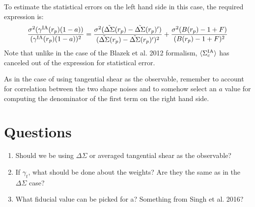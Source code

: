 \documentclass[onecolumn,amsmath,aps,fleqn, superscriptaddress]{revtex4}
\begin{document}
To estimate the statistical errors on the left hand side in this case, the required expression is:
\begin{equation}
\frac{\sigma^2(\gamma^{\rm IA}(r_p)(1-a))}{(\gamma^{\rm IA}(r_p)(1-a))^2} = \frac{\sigma^2(\tilde{\Delta \Sigma}(r_p) - \tilde{\Delta \Sigma}(r_p)^\prime)}{(\tilde{\Delta \Sigma}(r_p) - \tilde{\Delta \Sigma}(r_p)^\prime)^2} + \frac{\sigma^2(B(r_p)-1+F)}{(B(r_p)-1+F)^2}
\label{error_DS}
\end{equation}
Note that unlike in the case of the Blazek et al. 2012 formalism, $\langle \Sigma_c^{\rm IA}\rangle$ has canceled out of the expression for statistical error. 

As in the case of using tangential shear as the observable, remember to account for correlation between the two shape noises and to somehow select an $a$ value for computing the denominator of the first term on the right hand side.

\section*{Questions}
\begin{enumerate}
\item{Should we be using $\Delta \Sigma$ or averaged tangential shear as the observable?}
\item{If $\gamma_t$, what should be done about the weights? Are they the same as in the $\Delta \Sigma$ case?}
\item{What fiducial value can be picked for a? Something from Singh et al. 2016?}
\end{enumerate}


\end{document}
